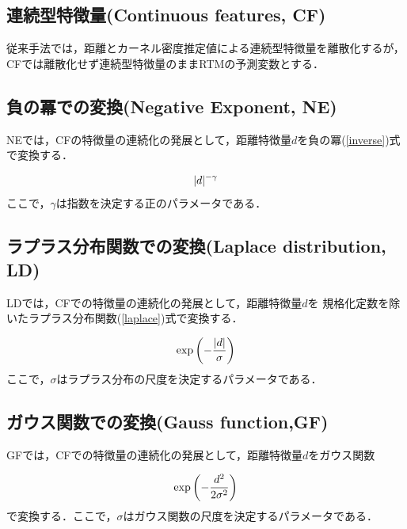 
\subsection{連続型特徴量(Continuous features, CF)}
従来手法\citep{caplan2015risk}では，距離とカーネル密度推定値による連続型特徴量を離散化するが，
CFでは離散化せず連続型特徴量のままRTMの予測変数とする．

\subsection{負の冪での変換(Negative Exponent, NE)}
NEでは，CFの特徴量の連続化の発展として，距離特徴量$d$を負の冪(\ref{inverse})式で変換する．

\begin{equation}\label{inverse}
  \lvert d\rvert^{-\gamma}
\end{equation}
ここで，$\gamma$は指数を決定する正のパラメータである．

\subsection{ラプラス分布関数での変換(Laplace distribution, LD)}
LDでは，CFでの特徴量の連続化の発展として，距離特徴量$d$を
規格化定数を除いたラプラス分布関数(\ref{laplace})式で変換する．

\begin{equation}\label{laplace}
  \exp \left( -\frac{\lvert d\rvert}{\sigma}\right)
\end{equation}
ここで，$\sigma$はラプラス分布の尺度を決定するパラメータである．


\subsection{ガウス関数での変換(Gauss function,GF)}
GFでは，CFでの特徴量の連続化の発展として，距離特徴量$d$をガウス関数

\begin{equation}\label{gauss}
  \exp \left(-\frac{d^2}{2\sigma^2} \right) \notag
\end{equation}
で変換する．ここで，$\sigma$はガウス関数の尺度を決定するパラメータである．

